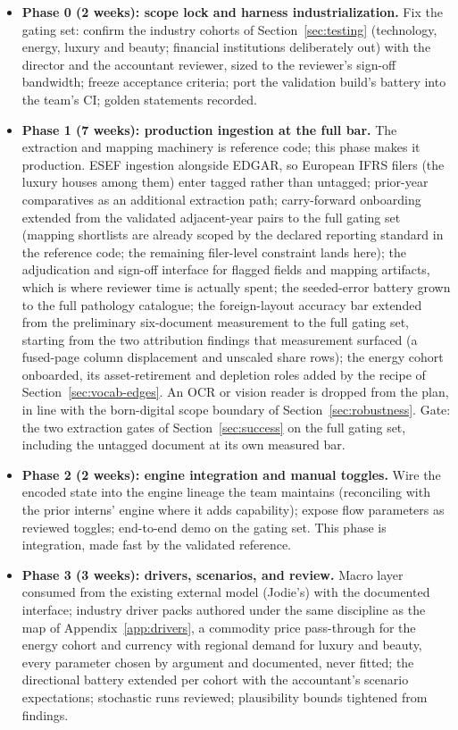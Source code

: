 \documentclass[11pt]{article}
\begin{document}
\begin{itemize}
  \item \textbf{Phase 0 (2 weeks): scope lock and harness industrialization.} Fix the gating set: confirm the industry cohorts of Section~\ref{sec:testing} (technology, energy, luxury and beauty; financial institutions deliberately out) with the director and the accountant reviewer, sized to the reviewer's sign-off bandwidth; freeze acceptance criteria; port the validation build's battery into the team's CI; golden statements recorded.
  \item \textbf{Phase 1 (7 weeks): production ingestion at the full bar.} The extraction and mapping machinery is reference code; this phase makes it production. ESEF ingestion alongside EDGAR, so European IFRS filers (the luxury houses among them) enter tagged rather than untagged; prior-year comparatives as an additional extraction path; carry-forward onboarding extended from the validated adjacent-year pairs to the full gating set (mapping shortlists are already scoped by the declared reporting standard in the reference code; the remaining filer-level constraint lands here); the adjudication and sign-off interface for flagged fields and mapping artifacts, which is where reviewer time is actually spent; the seeded-error battery grown to the full pathology catalogue; the foreign-layout accuracy bar extended from the preliminary six-document measurement to the full gating set, starting from the two attribution findings that measurement surfaced (a fused-page column displacement and unscaled share rows); the energy cohort onboarded, its asset-retirement and depletion roles added by the recipe of Section~\ref{sec:vocab-edges}. An OCR or vision reader is dropped from the plan, in line with the born-digital scope boundary of Section~\ref{sec:robustness}. Gate: the two extraction gates of Section~\ref{sec:success} on the full gating set, including the untagged document at its own measured bar.
  \item \textbf{Phase 2 (2 weeks): engine integration and manual toggles.} Wire the encoded state into the engine lineage the team maintains (reconciling with the prior interns' engine where it adds capability); expose flow parameters as reviewed toggles; end-to-end demo on the gating set. This phase is integration, made fast by the validated reference.
  \item \textbf{Phase 3 (3 weeks): drivers, scenarios, and review.} Macro layer consumed from the existing external model (Jodie's) with the documented interface; industry driver packs authored under the same discipline as the map of Appendix~\ref{app:drivers}, a commodity price pass-through for the energy cohort and currency with regional demand for luxury and beauty, every parameter chosen by argument and documented, never fitted; the directional battery extended per cohort with the accountant's scenario expectations; stochastic runs reviewed; plausibility bounds tightened from findings.

\end{itemize}
\end{document}
